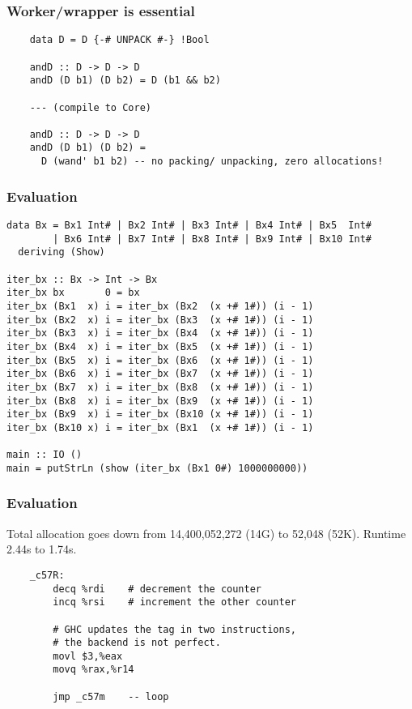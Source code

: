 \documentclass{beamer}
\begin{document}
\begin{frame}[fragile]
    \frametitle{Worker/wrapper is essential}

    \begin{verbatim}
    data D = D {-# UNPACK #-} !Bool

    andD :: D -> D -> D
    andD (D b1) (D b2) = D (b1 && b2)

    --- (compile to Core)

    andD :: D -> D -> D
    andD (D b1) (D b2) =
      D (wand' b1 b2) -- no packing/ unpacking, zero allocations!

    \end{verbatim}
\end{frame}

\begin{frame}[fragile]
    \frametitle{Evaluation}

    \begin{verbatim}
data Bx = Bx1 Int# | Bx2 Int# | Bx3 Int# | Bx4 Int# | Bx5  Int#
        | Bx6 Int# | Bx7 Int# | Bx8 Int# | Bx9 Int# | Bx10 Int#
  deriving (Show)

iter_bx :: Bx -> Int -> Bx
iter_bx bx       0 = bx
iter_bx (Bx1  x) i = iter_bx (Bx2  (x +# 1#)) (i - 1)
iter_bx (Bx2  x) i = iter_bx (Bx3  (x +# 1#)) (i - 1)
iter_bx (Bx3  x) i = iter_bx (Bx4  (x +# 1#)) (i - 1)
iter_bx (Bx4  x) i = iter_bx (Bx5  (x +# 1#)) (i - 1)
iter_bx (Bx5  x) i = iter_bx (Bx6  (x +# 1#)) (i - 1)
iter_bx (Bx6  x) i = iter_bx (Bx7  (x +# 1#)) (i - 1)
iter_bx (Bx7  x) i = iter_bx (Bx8  (x +# 1#)) (i - 1)
iter_bx (Bx8  x) i = iter_bx (Bx9  (x +# 1#)) (i - 1)
iter_bx (Bx9  x) i = iter_bx (Bx10 (x +# 1#)) (i - 1)
iter_bx (Bx10 x) i = iter_bx (Bx1  (x +# 1#)) (i - 1)

main :: IO ()
main = putStrLn (show (iter_bx (Bx1 0#) 1000000000))
    \end{verbatim}
\end{frame}

\begin{frame}[fragile]
    \frametitle{Evaluation}

    Total allocation goes down from 14,400,052,272 (14G) to 52,048 (52K).
    Runtime 2.44s to 1.74s.


    \begin{verbatim}
    _c57R:
        decq %rdi    # decrement the counter
        incq %rsi    # increment the other counter

        # GHC updates the tag in two instructions,
        # the backend is not perfect.
        movl $3,%eax
        movq %rax,%r14

        jmp _c57m    -- loop
    \end{verbatim}
\end{frame}
\end{document}
